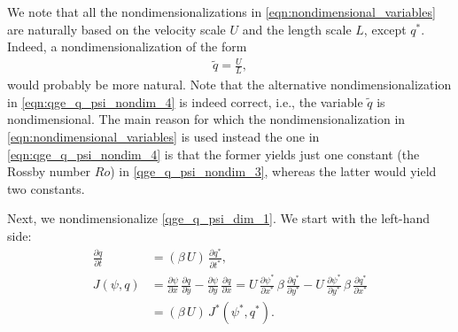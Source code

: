 We note that all the nondimensionalizations in
\eqref{eqn:nondimensional_variables} are naturally based on the velocity scale
$U$ and the length scale $L$, except $q^*$. Indeed, a nondimensionalization of
the form
\begin{align}
  {\tilde q} = \frac{U}{L},
  \label{eqn:qge_q_psi_nondim_4}
\end{align}
would probably be more natural. Note that the alternative nondimensionalization
in \eqref{eqn:qge_q_psi_nondim_4} is indeed correct, i.e., the variable ${\tilde
q}$ is nondimensional.  The main reason for which the nondimensionalization in
\eqref{eqn:nondimensional_variables} is used instead the one in
\eqref{eqn:qge_q_psi_nondim_4} is that the former yields just one constant (the
Rossby number $Ro$) in \eqref{qge_q_psi_nondim_3}, whereas the latter would
yield two constants.

Next, we nondimensionalize \eqref{qge_q_psi_dim_1}. We start with the left-hand
side:
\begin{align}
  \frac{\partial q}{\partial t} &= ( \beta \, U) \, \frac{\partial q^*}{\partial t^*} ,
    \label{eqn:qge_q_psi_nondim_5} \\[0.2cm]
  J(\psi,q) &=  \frac{\partial \psi}{\partial x} \, \frac{\partial q}{\partial y} - \frac{\partial
    \psi}{\partial y} \, \frac{\partial q}{\partial x}
    = U \, \frac{\partial \psi^*}{\partial x^*} \, \beta \, \frac{\partial q^*}{\partial y^*} - U \,
      \frac{\partial \psi^*}{\partial y^*} \,  \beta \, \frac{\partial q^*}{\partial x^*}
      \nonumber \\[0.2cm]
  &= (  \beta \, U ) \, J^*(\psi^*,q^*) .
  \label{eqn:qge_q_psi_nondim_6}
\end{align}

